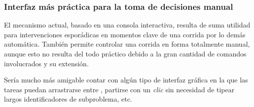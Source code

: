 \subsubsection{Interfaz más práctica para la toma de decisiones manual}

El mecanismo actual, basado en una consola interactiva, resulta de suma utilidad para intervenciones esporádicas en momentos clave de una corrida por lo demás automática. También permite controlar una corrida en forma totalmente manual, aunque esto no resulta del todo práctico debido a la gran cantidad de comandos involucrados y su extensión.

Sería mucho más amigable contar con algún tipo de interfaz gráfica en la que las tareas puedan arrastrarse entre \ws, partirse con un \emph{clic} sin necesidad de tipear largos identificadores de subproblema, etc.



